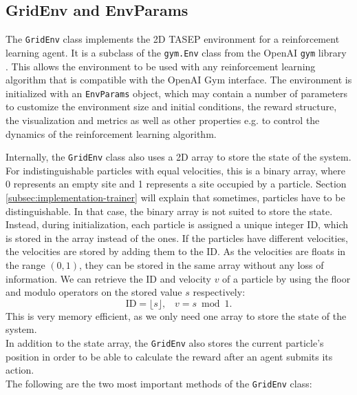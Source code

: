 \subsection{GridEnv and EnvParams}
\label{subsec:implementation-gridenv}
The \texttt{GridEnv} class implements the 2D TASEP environment for a reinforcement learning agent. It is a subclass of the \texttt{gym.Env} class from the OpenAI \texttt{gym} library \cite{brockman_openai_2016}. This allows the environment to be used with any reinforcement learning algorithm that is compatible with the OpenAI Gym interface. The environment is initialized with an \texttt{EnvParams} object, which may contain a number of parameters to customize the environment size and initial conditions, the reward structure, the visualization and metrics as well as other properties e.g. to control the dynamics of the reinforcement learning algorithm. 


Internally, the \texttt{GridEnv} class also uses a 2D array to store the state of the system. For indistinguishable particles with equal velocities, this is a binary array, where 0 represents an empty site and 1 represents a site occupied by a particle. Section \ref{subsec:implementation-trainer} will explain that sometimes, particles have to be distinguishable. In that case, the binary array is not suited to store the state. Instead, during initialization, each particle is assigned a unique integer ID, which is stored in the array instead of the ones. If the particles have different velocities, the velocities are stored by adding them to the ID. As the velocities are floats in the range $(0,1)$, they can be stored in the same array without any loss of information. We can retrieve the ID and velocity $v$ of a particle by using the floor and modulo operators on the stored value $s$ respectively:
\begin{equation}
    \text{ID} = \lfloor s \rfloor \text{,} \quad v = s \bmod 1 \text{.}
    \label{eq:state-to-id-velocity}
\end{equation}
This is very memory efficient, as we only need one array to store the state of the system. 
\\
In addition to the state array, the \texttt{GridEnv} also stores the current particle's position in order to be able to calculate the reward after an agent submits its action. 
\\
The following are the two most important methods of the \texttt{GridEnv} class:

